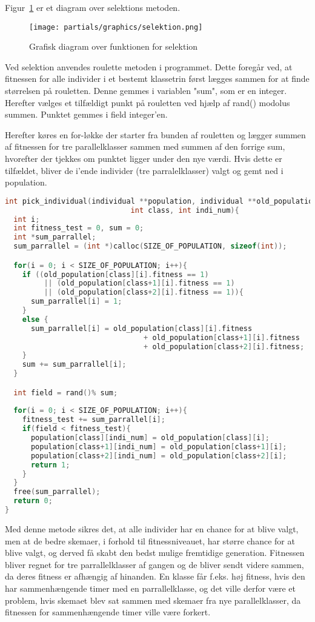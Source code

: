 Figur~\ref{fig:diagramselektion} er et diagram over selektions metoden.
\begin{figure}[!h]
\texttt{[image: partials/graphics/selektion.png]}
\caption{Grafisk diagram over funktionen for selektion}
\label{fig:diagramselektion}
\end{figure}

Ved selektion anvendes roulette metoden i programmet. Dette foregår ved, at fitnessen for alle individer i et bestemt klassetrin først lægges sammen for at finde størrelsen på rouletten. Denne gemmes i variablen "sum", som er en integer. Herefter vælges et tilfældigt punkt på rouletten ved hjælp af rand() modolus summen. Punktet gemmes i field integer'en.

Herefter køres en for-løkke der starter fra bunden af rouletten og lægger summen af fitnessen for tre parallelklasser sammen med summen af den forrige sum, hvorefter der tjekkes om punktet ligger under den nye værdi. Hvis dette er tilfældet, bliver de i'ende individer (tre parralelklasser) valgt og gemt ned i population.  

\begin{lstlisting}[language = c]
int pick_individual(individual **population, individual **old_population,
                             int class, int indi_num){
  int i;
  int fitness_test = 0, sum = 0;
  int *sum_parrallel;
  sum_parrallel = (int *)calloc(SIZE_OF_POPULATION, sizeof(int));

  for(i = 0; i < SIZE_OF_POPULATION; i++){
    if ((old_population[class][i].fitness == 1) 
         || (old_population[class+1][i].fitness == 1) 
         || (old_population[class+2][i].fitness == 1)){
      sum_parrallel[i] = 1;
    }
    else {
      sum_parrallel[i] = old_population[class][i].fitness 
                                + old_population[class+1][i].fitness 
                                + old_population[class+2][i].fitness;
    }
    sum += sum_parrallel[i];
  }

  int field = rand()% sum;
  
  for(i = 0; i < SIZE_OF_POPULATION; i++){
    fitness_test += sum_parrallel[i];
    if(field < fitness_test){
      population[class][indi_num] = old_population[class][i];
      population[class+1][indi_num] = old_population[class+1][i];
      population[class+2][indi_num] = old_population[class+2][i];
      return 1;
    }
  }
  free(sum_parrallel); 
  return 0;
}
\end{lstlisting}

Med denne metode sikres det, at alle individer har en chance for at blive valgt, men at de bedre skemaer, i forhold til fitnessniveauet, har større chance for at blive valgt, og derved få skabt den bedst mulige fremtidige generation. Fitnessen bliver regnet for tre parrallelklasser af gangen og de bliver sendt videre sammen, da deres fitness er afhængig af hinanden. En klasse får f.eks. høj fitness, hvis den har sammenhængende timer med en parrallelklasse, og det ville derfor være et problem, hvis skemaet blev sat sammen med skemaer fra nye parallelklasser, da fitnessen for sammenhængende timer ville være forkert.